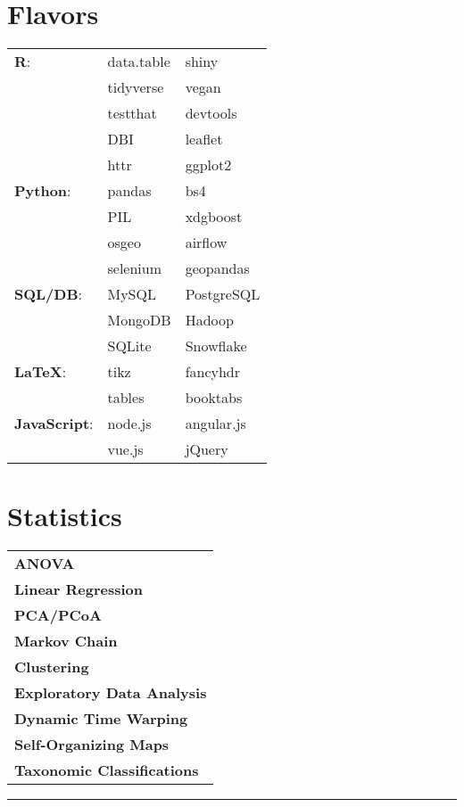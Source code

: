 \documentclass[10pt]{article}%
\begin{document}
\begin{minipage}[t]{.5\linewidth}%
\flushleft
\section*{\faCubes{} Flavors}%
   {\small
      \begin{tabularx}{\linewidth}{p{.2\linewidth}XX}
         \textbf{R}: & data.table & shiny \\
                     & tidyverse  & vegan \\
                     & testthat   & devtools \\
                     & DBI        & leaflet \\
                     & httr       & ggplot2 \\
         \hline
         \textbf{Python}: & pandas & bs4 \\
                          & PIL    & xdgboost \\
                          & osgeo  & airflow \\
                          & selenium & geopandas \\
         \hline
         \textbf{SQL/DB}: & MySQL & PostgreSQL \\
                       & MongoDB & Hadoop \\
                       & SQLite  & Snowflake \\
         \hline
         \textbf{\LaTeX }:  & tikz   & fancyhdr \\
                           & tables & booktabs \\
         \hline
         \textbf{JavaScript}: & node.js & angular.js \\
                              & vue.js & jQuery
     \end{tabularx}}
     \flushleft%
\end{minipage}
\begin{minipage}[t]{.2\linewidth}%
   \section*{\faBarChart{} Statistics}%
   \flushright
   {\small
      \begin{tabularx}{\linewidth}{X}
        \textbf{ANOVA} \\
        \textbf{Linear Regression} \\
        \textbf{PCA/PCoA} \\
        \textbf{Markov Chain} \\
        \textbf{Clustering} \\
        \textbf{Exploratory Data Analysis} \\
        \textbf{Dynamic Time Warping} \\
        \textbf{Self-Organizing Maps} \\
        \textbf{Taxonomic Classifications} \\
      \end{tabularx}}
      \flushleft%
\end{minipage}
\par\noindent\rule{\textwidth}{0.4pt}
\end{document}
